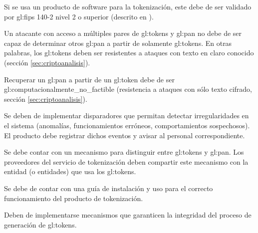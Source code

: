 {
  Si se usa un producto de software para la tokenización, este debe de ser
  validado por \gls{gl:fips} 140-2 nivel 2 o superior (descrito en
  \cite{nist_modulos_criptograficos}).
}

{
  Un atacante con acceso a múltiples pares de \glspl{gl:token} y
  \gls{gl:pan} no debe de ser capaz de determinar otros \gls{gl:pan} a partir
  de solamente \glspl{gl:token}. En otras palabras, los \glspl{gl:token}
  deben ser resistentes a ataques con texto en claro conocido (sección
  \ref{sec:criptoanalisis}).
}

{
  Recuperar un \gls{gl:pan} a partir de un \gls{gl:token} debe de ser
  \gls{gl:computacionalmente_no_factible} (resistencia a ataques con sólo
  texto cifrado, sección \ref{sec:criptoanalisis}).
}

{
  Se deben de implementar disparadores que permitan detectar
  irregularidades en el sistema (anomalías, funcionamientos erróneos,
  comportamientos sospechosos). El producto debe registrar dichos eventos y
  avisar al personal correspondiente.
}

{
  Se debe contar con un mecanismo para distinguir entre \glspl{gl:token}
  y \gls{gl:pan}. Los proveedores del servicio de tokenización deben
  compartir este mecanismo con la entidad (o entidades) que usa los
  \glspl{gl:token}.
}

{
  Se debe de contar con una guía de instalación y uso para el correcto
  funcionamiento del producto de tokenización.
}

{
  Deben de implementarse mecanismos que garanticen la integridad del proceso
  de generación de \glspl{gl:token}.
}

